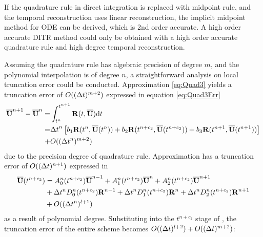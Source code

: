 If the quadrature rule in direct integration is replaced with
midpoint rule, and the temporal reconstruction uses linear
reconstruction, the implicit midpoint method for ODE can be derived,
which is 2nd order accurate. A high order accurate DITR method could
only be obtained with a high order accurate quadrature rule and
high degree temporal reconstruction.

Assuming the quadrature rule has algebraic precision
of degree $m$, and the polynomial interpolation is of degree $n$,
a straightforward analysis on local truncation error could be conducted.
Approximation \eqref{eq:Quad3} yields a
truncation error of $O(({\Delta} t)^{m+2} )$ expressed in equation \eqref{eq:Quad3Err}
\begin{equation}
    \label{eq:Quad3Err}
    \begin{aligned}
        \overline{\mathbf{U}}^{n+1} - \overline{\mathbf{U}}^{n} = & \int_{t^n}^{t^{n+1}}{
        \mathbf{R}(t, \overline{\mathbf{U}})\dd t}                              \\  = &
        {{\Delta} t}^{n}
        \left[
            b_1\mathbf{R}(t^n, \overline{\mathbf{U}}(t^n))
            +
            b_2\mathbf{R}(t^{n+c_2}, \overline{\mathbf{U}}(t^{n+c_2}))
            +
            b_3\mathbf{R}(t^{n+1}, \overline{\mathbf{U}}(t^{n+1}))
            \right]
        \\ + &
        O(({\Delta} t^{n})^{m+2} )
    \end{aligned}
\end{equation}
due to the precision degree of quadrature rule.
Approximation
 has a truncation error of $O(({\Delta} t)^{n+1})$
expressed in 
\begin{equation}
    \begin{aligned}
        \label{eq:TRErr}
        \overline{\mathbf{U}}(t^{n+c_2}) & =
        A^n_0(t^{n+c_2})\overline{\mathbf{U}}^{n - 1} +
        A^n_1(t^{n+c_2})\overline{\mathbf{U}}^{n} +
        A^n_2(t^{n+c_2})\overline{\mathbf{U}}^{n + 1}
        \\ & +
        {\Delta} t^n D^n_0(t^{n+c_2})\mathbf{R}^{n - 1} +
        {\Delta} t^n D^n_1(t^{n+c_2})\mathbf{R}^{n} +
        {\Delta} t^n D^n_2(t^{n+c_2})\mathbf{R}^{n + 1}
        \\ & +
        O(({\Delta} t^{n})^{l+1} )
    \end{aligned}
\end{equation}
as a result of polynomial degree.
Substituting  into the $t^{n+c_2}$ stage
of , the truncation error
of the entire scheme becomes $O(({\Delta} t)^{l+2}) + O(({\Delta} t)^{m+2})$:
